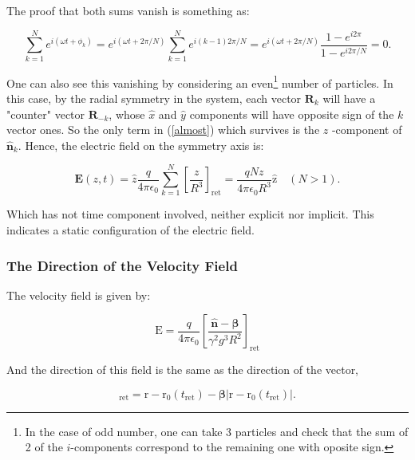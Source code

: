 The proof that both sums vanish is something as:

\begin{equation}
	\sum_{k=1}^{N} e^{i\left(\omega t+\phi_{k}\right)}=e^{i(\omega t+2 \pi / N)} \sum_{k=1}^{N} e^{i(k-1) 2 \pi / N}=e^{i(\omega t+2 \pi / N)} \frac{1-e^{i 2 \pi}}{1-e^{i 2 \pi / N}}=0.
\end{equation}

One can also see this vanishing by considering an even\footnote{In the case of odd number, one can take 3 particles and check that the sum of 2 of the $i$-components correspond to the remaining one with oposite sign.} number of particles. In this case, by the radial symmetry in the system, each vector $\mathbf{R}_{k}$ will have a "counter" vector $\mathbf{R}_{-k}$, whose $\hat{x}$ and $\hat{y}$ components will have opposite sign of the $k$ vector ones. So the only term in (\ref{almost}) which survives is the $z$ -component of $\hat{\mathbf{n}}_{k} .$ Hence, the electric field on the symmetry axis is:

\begin{equation}
	\mathbf{E}(z, t)=\hat{z} \frac{q}{4 \pi \epsilon_{0}} \sum_{k=1}^{N}\left[\frac{z}{R^{3}}\right]_{\mathrm{ret}}=\frac{q N z}{4 \pi \epsilon_{0} R^{3}} \hat{\mathrm{z}} \quad(N>1).
\end{equation}

Which has not time component involved, neither explicit nor implicit. This indicates a static configuration of the electric field.

\subsubsection{The Direction of the Velocity Field}\label{The Direction of the Velocity Field}

The velocity field is given by:

\begin{equation}
	\mathrm{E}=\frac{q}{4 \pi \epsilon_{0}}\left[\frac{\hat{\mathbf{n}}-\boldsymbol{\beta}}{\gamma^{2} g^{3} R^{2}}\right]_{\mathrm{ret}}
\end{equation}

And the direction of this field is the same as the direction of the vector,

\begin{equation}
	[\mathbf{R}-\boldsymbol{\beta}R]_{\mathrm{ret}}=\mathrm{r}-\mathrm{r}_{0}\left(t_{\mathrm{ret}}\right)-\boldsymbol{\beta}\left|\mathrm{r}-\mathrm{r}_{0}\left(t_{\mathrm{ret}}\right)\right|.
\end{equation}

